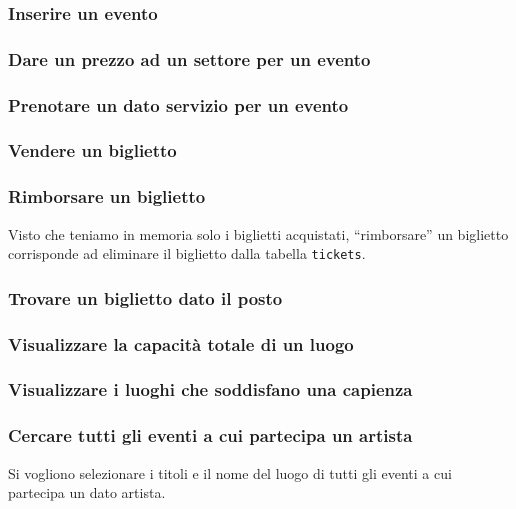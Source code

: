 \documentclass[a4paper,11pt]{article}
\begin{document}
\subsubsection{Inserire un evento}


\subsubsection{Dare un prezzo ad un settore per un evento}


\subsubsection{Prenotare un dato servizio per un evento}


\subsubsection{Vendere un biglietto}


\subsubsection{Rimborsare un biglietto}
Visto che teniamo in memoria solo i biglietti acquistati, ``rimborsare'' un
biglietto corrisponde ad eliminare il biglietto dalla tabella \texttt{tickets}.


\subsubsection{Trovare un biglietto dato il posto}


\subsubsection{Visualizzare la capacità totale di un luogo}


\subsubsection{Visualizzare i luoghi che soddisfano una capienza}


\subsubsection{Cercare tutti gli eventi a cui partecipa un artista}
Si vogliono selezionare i titoli e il nome del luogo di tutti gli eventi a cui
partecipa un dato artista.

\end{document}
